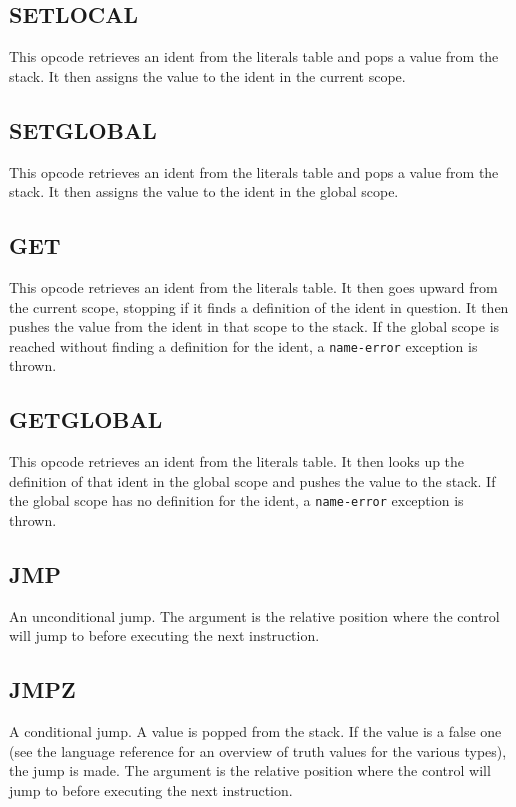 \subsection{SET\textunderscore{}LOCAL}
\label{sec:set-local}
This opcode retrieves an ident from the literals table and pops a
value from the stack. It then assigns the value to the ident in the
current scope.

\subsection{SET\textunderscore{}GLOBAL}
\label{sec:set-global}
This opcode retrieves an ident from the literals table and pops a
value from the stack. It then assigns the value to the ident in the
global scope.

\subsection{GET}
\label{sec:get}
This opcode retrieves an ident from the literals table. It then goes
upward from the current scope, stopping if it finds a definition of the
ident in question. It then pushes the value from the ident in that scope
to the stack. If the global scope is reached without finding a
definition for the ident, a \verb!name-error! exception is thrown.

\subsection{GET\textunderscore{}GLOBAL}
\label{sec:get-global}
This opcode retrieves an ident from the literals table. It then looks up
the definition of that ident in the global scope and pushes the value to
the stack. If the global scope has no definition for the ident, a
\verb!name-error! exception is thrown.

\subsection{JMP}
\label{sec:jmp}
An unconditional jump. The argument is the relative position where the
control will jump to before executing the next instruction.

\subsection{JMPZ}
\label{sec:jmpz}
A conditional jump. A value is popped from the stack. If the value is
a false one (see the language reference for an overview of truth values
for the various types), the jump is made. The argument is the relative
position where the control will jump to before executing the next
instruction.

